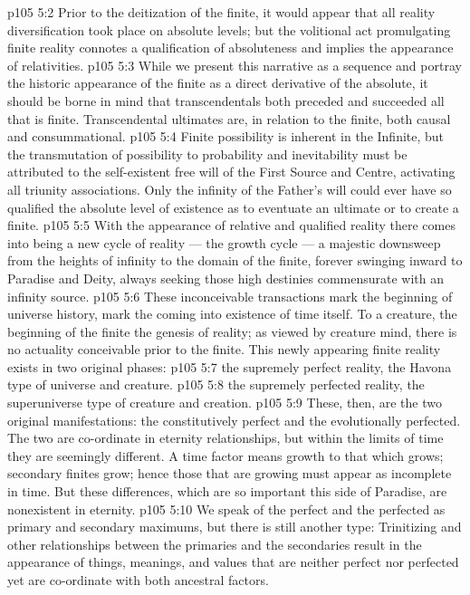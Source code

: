 \vs p105 5:2 Prior to the deitization of the finite, it would appear that all reality diversification took place on absolute levels; but the volitional act promulgating finite reality connotes a qualification of absoluteness and implies the appearance of relativities.
\vs p105 5:3 \pc While we present this narrative as a sequence and portray the historic appearance of the finite as a direct derivative of the absolute, it should be borne in mind that transcendentals both preceded and succeeded all that is finite. Transcendental ultimates are, in relation to the finite, both causal and consummational.
\vs p105 5:4 \pc Finite possibility is inherent in the Infinite, but the transmutation of possibility to probability and inevitability must be attributed to the self\hyp{}existent free will of the First Source and Centre, activating all triunity associations. Only the infinity of the Father’s will could ever have so qualified the absolute level of existence as to eventuate an ultimate or to create a finite.
\vs p105 5:5 With the appearance of relative and qualified reality there comes into being a new cycle of reality --- the growth cycle --- a majestic downsweep from the heights of infinity to the domain of the finite, forever swinging inward to Paradise and Deity, always seeking those high destinies commensurate with an infinity source.
\vs p105 5:6 These inconceivable transactions mark the beginning of universe history, mark the coming into existence of time itself. To a creature, the beginning of the finite  the genesis of reality; as viewed by creature mind, there is no actuality conceivable prior to the finite. This newly appearing finite reality exists in two original phases:
\vs p105 5:7 \bibnobreakspace {} the supremely perfect reality, the Havona type of universe and creature.
\vs p105 5:8 \bibnobreakspace {} the supremely perfected reality, the superuniverse type of creature and creation.
\vs p105 5:9 \pc These, then, are the two original manifestations: the constitutively perfect and the evolutionally perfected. The two are co\hyp{}ordinate in eternity relationships, but within the limits of time they are seemingly different. A time factor means growth to that which grows; secondary finites grow; hence those that are growing must appear as incomplete in time. But these differences, which are so important this side of Paradise, are nonexistent in eternity.
\vs p105 5:10 We speak of the perfect and the perfected as primary and secondary maximums, but there is still another type: Trinitizing and other relationships between the primaries and the secondaries result in the appearance of  things, meanings, and values that are neither perfect nor perfected yet are co\hyp{}ordinate with both ancestral factors.
